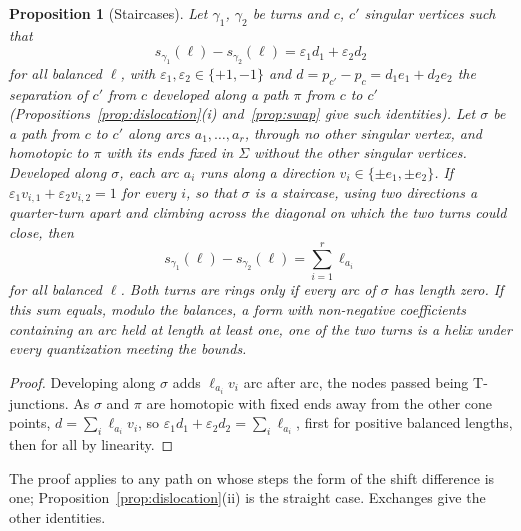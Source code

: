 \documentclass[11pt,a4paper]{article}
\newtheorem{proposition}{Proposition}
\newcommand{\shift}{s}
\newcommand{\lean}[1]{\texttt{\detokenize{#1}}}
\newenvironment{evidence}[3][]{}{}
\begin{document}
\begin{evidence}{core}{\lean{staircase}, \lean{staircase_rings}; assumed: the vector between the vertices is the sum along the staircase}
\begin{proposition}[Staircases]\label{prop:staircase}
Let $\gamma_1$, $\gamma_2$ be turns and $c$, $c'$ singular vertices such that
\[
  \shift_{\gamma_1}(\ell) - \shift_{\gamma_2}(\ell) = \varepsilon_1 d_1 +
  \varepsilon_2 d_2
\]
for all balanced $\ell$, with $\varepsilon_1, \varepsilon_2 \in \{+1, -1\}$
and $d = p_{c'} - p_c = d_1 e_1 + d_2 e_2$ the separation of $c'$ from $c$
developed along a path $\pi$ from $c$ to $c'$
(Propositions~\ref{prop:dislocation}(i) and~\ref{prop:swap} give such
identities). Let $\sigma$ be a path from $c$ to $c'$ along arcs $a_1, \dots,
a_r$, through no other singular vertex, and homotopic to $\pi$ with its ends
fixed in $\Sigma$ without the other singular vertices. Developed along
$\sigma$, each arc $a_i$ runs along a direction $v_i \in \{\pm e_1, \pm
e_2\}$. If $\varepsilon_1 v_{i,1} + \varepsilon_2 v_{i,2} = 1$ for every $i$,
so that $\sigma$ is a \emph{staircase}, using two directions a quarter-turn
apart and climbing across the diagonal on which the two turns could close,
then
\[
  \shift_{\gamma_1}(\ell) - \shift_{\gamma_2}(\ell) = \sum_{i=1}^r \ell_{a_i}
\]
for all balanced $\ell$. Both turns are rings only if every arc of $\sigma$
has length zero. If this sum equals, modulo the balances, a form with
non-negative coefficients containing an arc held at length at least one, one
of the two turns is a helix under every quantization meeting the bounds.
\end{proposition}
\end{evidence}

\begin{proof}
Developing along $\sigma$ adds $\ell_{a_i} v_i$ arc after arc, the nodes passed
being T-junctions. As $\sigma$ and $\pi$ are homotopic with fixed ends away
from the other cone points, $d = \sum_i \ell_{a_i} v_i$, so $\varepsilon_1 d_1
+ \varepsilon_2 d_2 = \sum_i \ell_{a_i}$, first for positive balanced lengths,
then for all by linearity.
\end{proof}

The proof applies to any path on whose steps the form of the shift difference
is one; Proposition~\ref{prop:dislocation}(ii) is the straight case.
Exchanges give the other identities.
\end{document}
